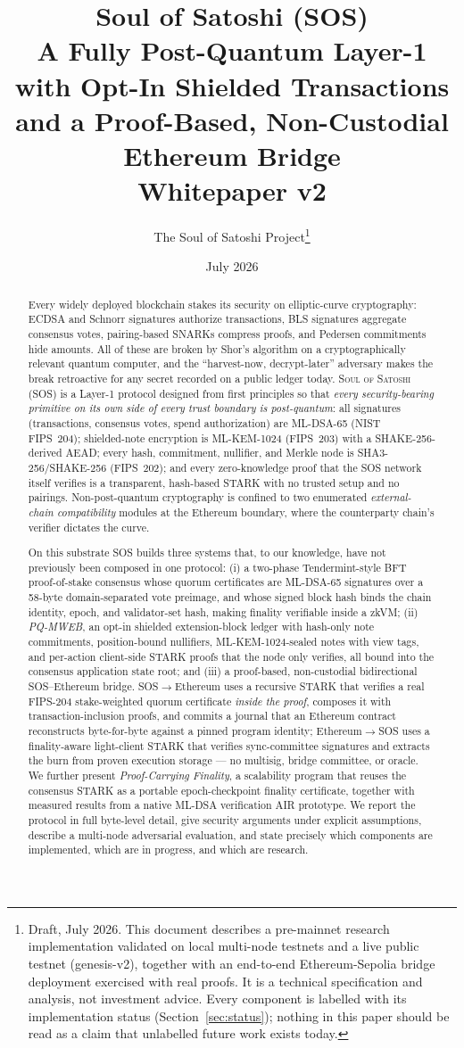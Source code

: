 \documentclass[11pt]{article}
\title{\textbf{\textcolor{sosorange}{Soul of Satoshi (SOS)}}\\[2mm]
\large A Fully Post-Quantum Layer-1 with Opt-In Shielded Transactions\\
and a Proof-Based, Non-Custodial Ethereum Bridge\\[1mm]
\normalsize Whitepaper v2}
\author{The Soul of Satoshi Project\thanks{Draft, July 2026. This document
describes a pre-mainnet research implementation validated on local multi-node
testnets and a live public testnet (genesis-v2), together with an end-to-end
Ethereum-Sepolia bridge deployment exercised with real proofs. It is a technical
specification and analysis, not investment advice.
Every component is labelled with its implementation status (Section~\ref{sec:status});
nothing in this paper should be read as a claim that unlabelled future work exists today.}}
\date{July 2026}
\newcommand{\sos}{\textsc{Soul of Satoshi}}
\newcommand{\mldsa}{ML\mbox{-}DSA\mbox{-}65}
\newcommand{\mlkem}{ML\mbox{-}KEM\mbox{-}1024}
\newcommand{\shake}{SHAKE\mbox{-}256}
\newcommand{\sha}{SHA3\mbox{-}256}
\theoremstyle{plain}
\theoremstyle{definition}
\theoremstyle{remark}
\begin{document}
\maketitle

\begin{abstract}
\noindent
Every widely deployed blockchain stakes its security on elliptic-curve
cryptography: ECDSA and Schnorr signatures authorize transactions, BLS
signatures aggregate consensus votes, pairing-based SNARKs compress proofs, and
Pedersen commitments hide amounts. All of these are broken by Shor's algorithm
on a cryptographically relevant quantum computer, and the
``harvest-now, decrypt-later'' adversary makes the break retroactive for any
secret recorded on a public ledger today. \sos{} (SOS) is a Layer-1
protocol designed from first principles so that \emph{every security-bearing
primitive on its own side of every trust boundary is post-quantum}: all
signatures (transactions, consensus votes, spend authorization) are \mldsa{}
(NIST FIPS~204); shielded-note encryption is \mlkem{} (FIPS~203) with a
\shake{}-derived AEAD; every hash, commitment, nullifier, and Merkle node is
\sha{}/\shake{} (FIPS~202); and every zero-knowledge proof that the SOS network
itself verifies is a transparent, hash-based STARK with no trusted setup and no
pairings. Non-post-quantum cryptography is confined to two enumerated
\emph{external-chain compatibility} modules at the Ethereum boundary, where the
counterparty chain's verifier dictates the curve.

On this substrate SOS builds three systems that, to our knowledge, have not
previously been composed in one protocol: (i) a two-phase Tendermint-style BFT
proof-of-stake consensus whose quorum certificates are \mldsa{} signatures over
a 58-byte domain-separated vote preimage, and whose signed block hash binds the
chain identity, epoch, and validator-set hash, making finality verifiable
inside a zkVM; (ii) \emph{PQ-MWEB}, an opt-in shielded extension-block ledger
with hash-only note commitments, position-bound nullifiers, \mlkem{}-sealed
notes with view tags, and per-action client-side STARK proofs that the node
only verifies, all bound into the consensus application state root; and (iii) a
proof-based, non-custodial bidirectional SOS--Ethereum bridge. SOS$\to$Ethereum
uses a recursive STARK that verifies a real FIPS-204 stake-weighted quorum
certificate \emph{inside the proof}, composes it with transaction-inclusion
proofs, and commits a journal that an Ethereum contract reconstructs
byte-for-byte against a pinned program identity; Ethereum$\to$SOS uses a
finality-aware light-client STARK that verifies sync-committee signatures and
extracts the burn from proven execution storage --- no multisig, bridge
committee, or oracle. We further present
\emph{Proof-Carrying Finality}, a scalability program that reuses the consensus
STARK as a portable epoch-checkpoint finality certificate, together with
measured results from a native ML-DSA verification AIR prototype. We report the
protocol in full byte-level detail, give security arguments under explicit
assumptions, describe a multi-node adversarial evaluation, and state precisely
which components are implemented, which are in progress, and which are research.
\end{abstract}
\end{document}
